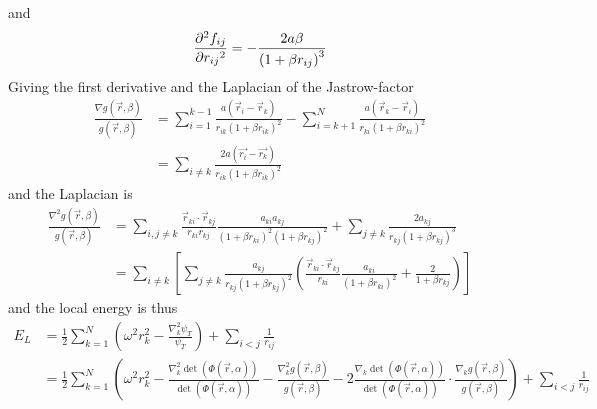 \documentclass[a4paper, hidelinks, 10pt]{article}\usepackage[utf8]{inputenc}
\newcommand{\suml}[2]{\sum\limits_{#1=1}^{#2}}
\begin{document}
    and
        \begin{equation}
            \prd{r_{ij}}[f_{ij}][2] = -\frac{2a\beta}{\left(1+\beta
            r_{ij}\right)^3}
            \label{eq:gfijder2}
        \end{equation}
    Giving the first derivative and the Laplacian of the Jastrow-factor
        \begin{equation}
            \begin{aligned}
                \frac{\nabla g(\vec{r},\beta)}{g(\vec{r},\beta)} &=
                \suml{i}{k-1}
                \frac{a\left(\vec{r}_i-\vec{r}_k\right)}{r_{ik}\left(1+\beta
                r_{ik}\right)^2} - \sum\limits_{i=k+1}^N
                \frac{a\left(\vec{r}_k-\vec{r}_i\right)}{r_{ki}\left(1+\beta
                r_{ki}\right)^2} \\
                &= \sum\limits_{i\neq k} \frac{2a\left(\vec{r_i} -
                \vec{r_k}\right)}{r_{ik}\left(1+\beta r_{ik}\right)^2}
            \end{aligned}
            \label{eq:jastfirderrat}
        \end{equation}
    and the Laplacian is
        \begin{equation}
            \begin{aligned}
                \frac{\nabla^2 g(\vec{r},\beta)}{g(\vec{r},\beta)} &=
                \sum\limits_{i,j\neq k}
                \frac{\vec{r}_{ki}\cdot\vec{r}_{kj}}{r_{ki}r_{kj}}
                \frac{a_{ki}a_{kj}}{\left(1+\beta r_{ki}\right)^2 \left(1+\beta
                r_{kj}\right)^2} + \sum_{j\neq k}
                \frac{2a_{kj}}{r_{kj}\left(1+\beta r_{kj}\right)^3} \\
                &= \sum_{i\neq k}\left[\sum_{j\neq k}
                \frac{a_{kj}}{r_{kj}\left(1+\beta r_{kj}\right)^2}
                \left(\frac{\vec{r}_{ki}\cdot\vec{r}_{kj}}{r_{ki}}
                \frac{a_{ki}}{\left(1+\beta r_{ki}\right)^2} + \frac{2}{1+\beta
                r_{kj}}\right)\right]
            \end{aligned}
            \label{eq:jastsecderrat}
        \end{equation}
    and the local energy is thus
        \begin{align}
            E_L &= \frac{1}{2}\suml{k}{N} \left(\omega^2r^2_k -
            \frac{\nabla^2_k\psi_T}{\psi_T}\right) + \sum_{i<j}
            \frac{1}{r_{ij}} \nonumber \\
            &= \frac{1}{2}\suml{k}{N} \left(\omega^2r^2_k -
            \frac{\nabla^2_k\det(\Phi(\vec{r},\alpha))}{\det(\Phi(\vec{r},\alpha))}
            - \frac{\nabla^2_kg(\vec{r},\beta)}{g(\vec{r},\beta)} -
            2\frac{\nabla_k\det(\Phi(\vec{r},\alpha))}{\det(\Phi(\vec{r},\alpha))}
            \cdot \frac{\nabla_kg(\vec{r},\beta)}{g(\vec{r},\beta)}\right) +
            \sum_{i<j} \frac{1}{r_{ij}}
            \label{eq:ELNfin}
        \end{align}
\end{document}
